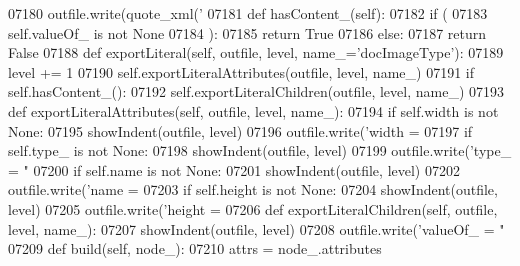 \begin{DoxyCode}
{{{{{{{{{{{{{{{{{{{{{{{{{{{{{{{{{{{{{{{{{{{{{{{{{{{{{{{{{{{{{{{{{{{{{{{{{{{{{{{{{{{{{{{{{{{{{{{{{{{{{{{{{{{{{{{{{{{{{{{{{{{{{{{{{{{{{{{{{{{{{{{{{{{{{{{{{{{{{{{{{{{{{{{{{{{{{{{{{{{{{{{{{{{{{{{{{{{{{{{{{{{{{{{{{{{{{{{{{{{{{{{{{{{{{{{{{{{{{{{{{{{{{{{{{{{{{{{{{{{{{{{{{{{{{{{{{{{{{{{{{{{{{{{{{{{{{{{{{{{{{{{{{{{{{{{{{{{{{{{{{{{{{{{{{{{{{{{{{{{{{{{{{{{{{{{{{{{{{{{{{{{{{{{{{{{{{{{{{{{{{{{{{{{{{{{{{{{{{{{{{{{{{{{{{{{{{{{{{{{{{{{{{{{{{{{{{{{{{{{{{{{{{{{{07180             outfile.write(quote_xml(\textcolor{stringliteral}{'%
07181     \textcolor{keyword}{def }hasContent_(self):
07182         \textcolor{keywordflow}{if} (
07183             self.valueOf_ \textcolor{keywordflow}{is} \textcolor{keywordflow}{not} \textcolor{keywordtype}{None}
07184             ):
07185             \textcolor{keywordflow}{return} \textcolor{keyword}{True}
07186         \textcolor{keywordflow}{else}:
07187             \textcolor{keywordflow}{return} \textcolor{keyword}{False}
07188     \textcolor{keyword}{def }exportLiteral(self, outfile, level, name\_='docImageType'):
07189         level += 1
07190         self.exportLiteralAttributes(outfile, level, name\_)
07191         \textcolor{keywordflow}{if} self.hasContent_():
07192             self.exportLiteralChildren(outfile, level, name\_)
07193     \textcolor{keyword}{def }exportLiteralAttributes(self, outfile, level, name\_):
07194         \textcolor{keywordflow}{if} self.width \textcolor{keywordflow}{is} \textcolor{keywordflow}{not} \textcolor{keywordtype}{None}:
07195             showIndent(outfile, level)
07196             outfile.write(\textcolor{stringliteral}{'width = %
07197         \textcolor{keywordflow}{if} self.type_ \textcolor{keywordflow}{is} \textcolor{keywordflow}{not} \textcolor{keywordtype}{None}:
07198             showIndent(outfile, level)
07199             outfile.write(\textcolor{stringliteral}{'type\_ = "%
07200         \textcolor{keywordflow}{if} self.name \textcolor{keywordflow}{is} \textcolor{keywordflow}{not} \textcolor{keywordtype}{None}:
07201             showIndent(outfile, level)
07202             outfile.write(\textcolor{stringliteral}{'name = %
07203         \textcolor{keywordflow}{if} self.height \textcolor{keywordflow}{is} \textcolor{keywordflow}{not} \textcolor{keywordtype}{None}:
07204             showIndent(outfile, level)
07205             outfile.write(\textcolor{stringliteral}{'height = %
07206     \textcolor{keyword}{def }exportLiteralChildren(self, outfile, level, name\_):
07207         showIndent(outfile, level)
07208         outfile.write(\textcolor{stringliteral}{'valueOf\_ = "%
07209     \textcolor{keyword}{def }build(self, node\_):
07210         attrs = node\_.attributes
}}}}}}}}}}}}}}}}}}}}}}}}}}}}}}}}}}}}}}}}}}}}}}}}}}}}}}}}}}}}}}}}}}}}}}}}}}}}}}}}}}}}}}}}}}}}}}}}}}}}}}}}}}}}}}}}}}}}}}}}}}}}}}}}}}}}}}}}}}}}}}}}}}}}}}}}}}}}}}}}}}}}}}}}}}}}}}}}}}}}}}}}}}}}}}}}}}}}}}}}}}}}}}}}}}}}}}}}}}}}}}}}}}}}}}}}}}}}}}}}}}}}}}}}}}}}}}}}}}}}}}}}}}}}}}}}}}}}}}}}}}}}}}}}}}}}}}}}}}}}}}}}}}}}}}}}}}}}}}}}}}}}}}}}}}}}}}}}}}}}}}}}}}}}}}}}}}}}}}}}}}}}}}}}}}}}}}}}}}}}}}}}}}}}}}}}}}}}}}}}}}}}}}}}}}}}}}}}}}}}}}}}}}}}}}}}}}}}}}}}}}}}}}}}}}}}}}
\end{DoxyCode}
